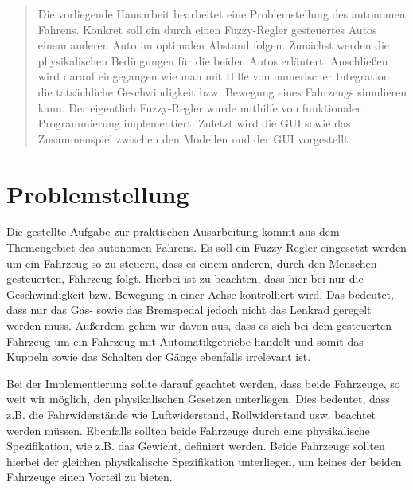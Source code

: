 \documentclass[12pt,a4paper,bibliography=totocnumbered,listof=totocnumbered, abstracton]{scrartcl}
\theoremstyle{Umgebung}
\begin{document}
\newtheorem{bsp}{Beispiel}
\newtheorem{defnt}{Definition}

\begin{abstract} 
	Die vorliegende Hausarbeit bearbeitet eine Problemstellung des autonomen Fahrens. Konkret soll ein durch einen Fuzzy-Regler gesteuertes Autos einem anderen Auto im optimalen Abstand folgen. Zunächst werden die physikalischen Bedingungen für die beiden Autos erläutert. Anschließen wird darauf eingegangen wie man mit Hilfe von numerischer Integration die tatsächliche Geschwindigkeit bzw. Bewegung eines Fahrzeugs simulieren kann. Der eigentlich Fuzzy-Regler wurde mithilfe von funktionaler Programmierung implementiert. Zuletzt wird die GUI sowie das Zusammenspiel zwischen den Modellen und der GUI vorgestellt.

\end{abstract} 
\newpage

\section{Problemstellung}

Die gestellte Aufgabe zur praktischen Ausarbeitung kommt aus dem Themengebiet des autonomen Fahrens. Es soll ein Fuzzy-Regler eingesetzt werden um ein Fahrzeug so zu steuern, dass es einem anderen, durch den Menschen gesteuerten, Fahrzeug folgt.  Hierbei ist zu beachten, dass hier bei nur die Geschwindigkeit bzw. Bewegung in einer Achse kontrolliert wird. Das bedeutet, dass nur das Gas- sowie das Bremspedal jedoch nicht das Lenkrad geregelt werden muss. Außerdem gehen wir davon aus, dass es sich bei dem gesteuerten Fahrzeug um ein Fahrzeug mit Automatikgetriebe handelt und somit das Kuppeln sowie das Schalten der Gänge ebenfalls irrelevant ist. 

Bei der Implementierung sollte darauf geachtet werden, dass beide Fahrzeuge, so weit wir möglich, den physikalischen Gesetzen unterliegen. Dies bedeutet, dass z.B. die Fahrwiderstände wie Luftwiderstand, Rollwiderstand usw. beachtet werden müssen. Ebenfalls sollten beide Fahrzeuge durch eine physikalische Spezifikation, wie z.B. das Gewicht, definiert werden. Beide Fahrzeuge sollten hierbei der gleichen physikalische Spezifikation unterliegen, um keines der beiden Fahrzeuge einen Vorteil zu bieten.
\end{document}
